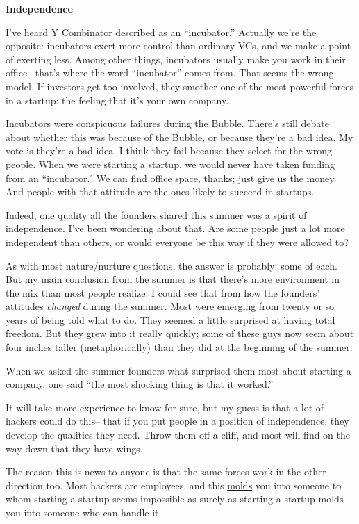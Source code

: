 \textbf{Independence}

I've heard Y Combinator described as an ``incubator.'' Actually we're
the opposite: incubators exert more control than ordinary VCs, and we
make a point of exerting less. Among other things, incubators usually
make you work in their office-- that's where the word ``incubator''
comes from. That seems the wrong model. If investors get too involved,
they smother one of the most powerful forces in a startup: the feeling
that it's your own company.

Incubators were conspicuous failures during the Bubble. There's still
debate about whether this was because of the Bubble, or because they're
a bad idea. My vote is they're a bad idea. I think they fail because
they select for the wrong people. When we were starting a startup, we
would never have taken funding from an ``incubator.'' We can find office
space, thanks; just give us the money. And people with that attitude are
the ones likely to succeed in startups.

Indeed, one quality all the founders shared this summer was a spirit of
independence. I've been wondering about that. Are some people just a lot
more independent than others, or would everyone be this way if they were
allowed to?

As with most nature/nurture questions, the answer is probably: some of
each. But my main conclusion from the summer is that there's more
environment in the mix than most people realize. I could see that from
how the founders' attitudes \emph{changed} during the summer. Most were
emerging from twenty or so years of being told what to do. They seemed a
little surprised at having total freedom. But they grew into it really
quickly; some of these guys now seem about four inches taller
(metaphorically) than they did at the beginning of the summer.

When we asked the summer founders what surprised them most about
starting a company, one said ``the most shocking thing is that it
worked.''

It will take more experience to know for sure, but my guess is that a
lot of hackers could do this-- that if you put people in a position of
independence, they develop the qualities they need. Throw them off a
cliff, and most will find on the way down that they have wings.

The reason this is news to anyone is that the same forces work in the
other direction too. Most hackers are employees, and this
\href{http://software.ericsink.com/entries/No_Great_Hackers.html}{molds}
you into someone to whom starting a startup seems impossible as surely
as starting a startup molds you into someone who can handle it.

